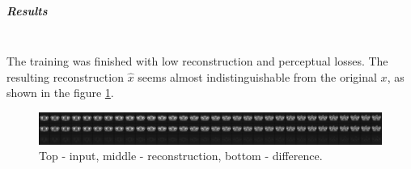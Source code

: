 \subparagraph{Results}\mbox{}\\

The training was finished with low reconstruction and perceptual losses. The resulting reconstruction $\hat{x}$ seems almost indistinguishable from the original $x$, as shown in the figure \ref{fig:md-vqgan-comparison}.

\begin{figure}[H]
    \centering
    \includegraphics[width=\linewidth]{reports/meta_vqgan_reconstruction_comparison.png}
    \caption{Top - input, middle - reconstruction, bottom - difference.}
    \label{fig:md-vqgan-comparison}
\end{figure}

